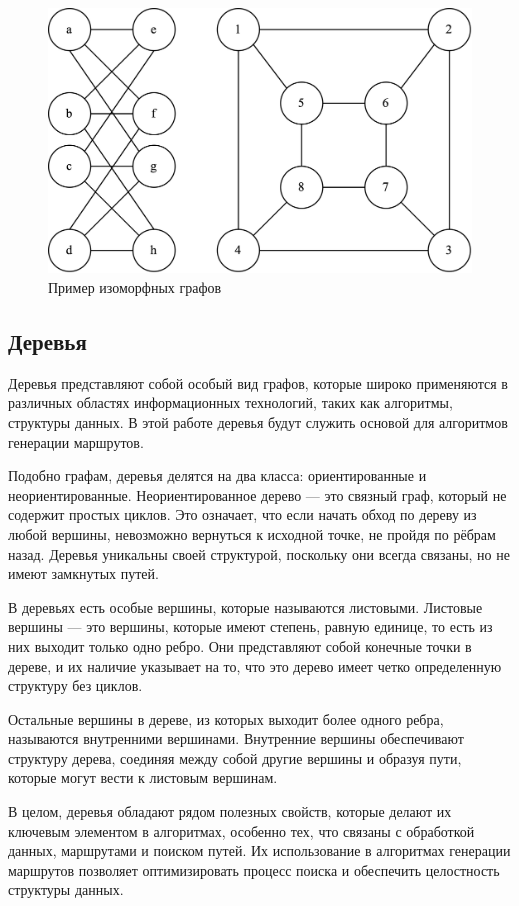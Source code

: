 \begin{figure}[H]
	\begin{center}
		\includegraphics[width=0.7\linewidth]{src/img/1/isomorphic_graphs.png}
		\caption{Пример изоморфных графов}
		\label{fig:isomorphic_graphs_example}
	\end{center}
\end{figure}

\subsection{Деревья}

Деревья представляют собой особый вид графов, которые широко применяются в различных областях информационных технологий, таких как алгоритмы, структуры данных. В этой работе деревья будут служить основой для алгоритмов генерации маршрутов.

Подобно графам, деревья делятся на два класса: ориентированные и неориентированные. Неориентированное дерево — это связный граф, который не содержит простых циклов. Это означает, что если начать обход по дереву из любой вершины, невозможно вернуться к исходной точке, не пройдя по рёбрам назад. Деревья уникальны своей структурой, поскольку они всегда связаны, но не имеют замкнутых путей.

В деревьях есть особые вершины, которые называются листовыми. Листовые вершины — это вершины, которые имеют степень, равную единице, то есть из них выходит только одно ребро. Они представляют собой конечные точки в дереве, и их наличие указывает на то, что это дерево имеет четко определенную структуру без циклов.

Остальные вершины в дереве, из которых выходит более одного ребра, называются внутренними вершинами. Внутренние вершины обеспечивают структуру дерева, соединяя между собой другие вершины и образуя пути, которые могут вести к листовым вершинам.

В целом, деревья обладают рядом полезных свойств, которые делают их ключевым элементом в алгоритмах, особенно тех, что связаны с обработкой данных, маршрутами и поиском путей. Их использование в алгоритмах генерации маршрутов позволяет оптимизировать процесс поиска и обеспечить целостность структуры данных.



